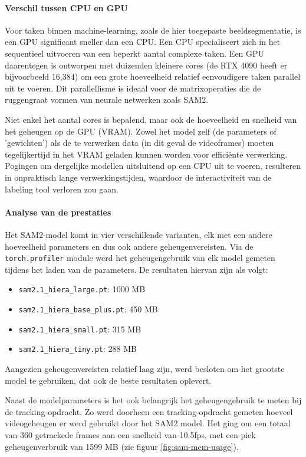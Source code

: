 \paragraph{Verschil tussen CPU en GPU}
Voor taken binnen machine-learning, zoals de hier toegepaste beeldsegmentatie, is een GPU significant sneller dan een CPU. 
Een CPU specialiseert zich in het sequentieel uitvoeren van een beperkt aantal complexe taken. 
Een GPU daarentegen is ontworpen met duizenden kleinere cores (de RTX 4090 heeft er bijvoorbeeld 16,384) 
om een grote hoeveelheid relatief eenvoudigere taken parallel uit te voeren. 
Dit parallellisme is ideaal voor de matrixoperaties die de ruggengraat vormen van neurale netwerken zoals SAM2.

Niet enkel het aantal cores is bepalend, maar ook de hoeveelheid en snelheid van het geheugen op de GPU (VRAM).
Zowel het model zelf (de parameters of 'gewichten') als de te verwerken data (in dit geval de videoframes) moeten tegelijkertijd 
in het VRAM geladen kunnen worden voor efficiënte verwerking.
Pogingen om dergelijke modellen uitsluitend op een CPU uit te voeren, resulteren in onpraktisch lange verwerkingstijden, 
waardoor de interactiviteit van de labeling tool verloren zou gaan.

\paragraph{Analyse van de prestaties}

Het SAM2-model komt in vier verschillende varianten, elk met een andere hoeveelheid parameters en dus ook andere geheugenvereisten.
Via de \texttt{torch.profiler} module werd het geheugengebruik van elk model gemeten tijdens het laden van de parameters.
De resultaten hiervan zijn als volgt:

\begin{itemize}
    \item \texttt{sam2.1\_hiera\_large.pt}: 1000 MB
    \item \texttt{sam2.1\_hiera\_base\_plus.pt}: 450 MB
    \item \texttt{sam2.1\_hiera\_small.pt}: 315 MB
    \item \texttt{sam2.1\_hiera\_tiny.pt}: 288 MB
\end{itemize}

Aangezien geheugenvereisten relatief laag zijn, werd besloten om het grootste model te gebruiken, dat ook de beste resultaten oplevert.

Naast de modelparameters is het ook belangrijk het geheugengebruik te meten bij de tracking-opdracht.
Zo werd doorheen een tracking-opdracht gemeten hoeveel videogeheugen er werd gebruikt door het SAM2 model.
Het ging om een totaal van 360 getrackede frames aan een snelheid van 10.5fps, met een piek geheugenverbruik van 1599 MB (zie figuur \ref{fig:sam-mem-usage}).

